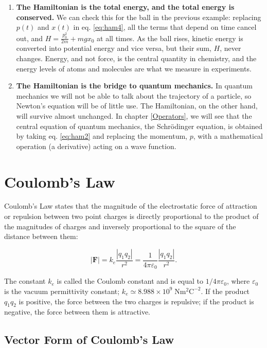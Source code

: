 \documentclass[
  english,
  9pt,
]{extbook}
\theoremstyle{definition}
\theoremstyle{definition}
\theoremstyle{definition}
\theoremstyle{definition}
\theoremstyle{remark}
\begin{document}
\begin{enumerate}
\def\labelenumi{\arabic{enumi}.}
\item
  \textbf{The Hamiltonian is the total energy, and the total energy is conserved.} We can check this for the ball in the previous example: replacing \(p(t)\) and \(x(t)\) in eq. \eqref{eq:ham4}, all the terms that depend on time cancel out, and \(H=\frac{p_0^2}{2m}+mgx_0\) at all times. As the ball rises, kinetic energy is converted into potential energy and vice versa, but their sum, \(H\), never changes. Energy, and not force, is the central quantity in chemistry, and the energy levels of atoms and molecules are what we measure in experiments.
\item
  \textbf{The Hamiltonian is the bridge to quantum mechanics.} In quantum mechanics we will not be able to talk about the trajectory of a particle, so Newton's equation will be of little use. The Hamiltonian, on the other hand, will survive almost unchanged. In chapter \ref{Operators}, we will see that the central equation of quantum mechanics, the Schrödinger equation, is obtained by taking eq. \eqref{eq:ham2} and replacing the momentum, \(p\), with a mathematical operation (a derivative) acting on a wave function.
\end{enumerate}

\section{Coulomb's Law}\label{coulombs-law}

Coulomb's Law states that the magnitude of the electrostatic force of attraction or repulsion between two point charges is directly proportional to the product of the magnitudes of charges and inversely proportional to the square of the distance between them:

\begin{equation}
|\mathbf{F}| = k_e \frac{|q_1q_2|}{r^2} = \frac{1}{4\pi\varepsilon_0}\frac{|q_1q_2|}{r^{2}}.
\label{eq:coulomb1}
\end{equation}

The constant \(k_e\) is called the Coulomb constant and is equal to \({1}/{4\pi\varepsilon_0}\), where \(\varepsilon_0\) is the vacuum permittivity constant; \(k_e \simeq 8.988\times10^9\;\mathrm{Nm^2C^{-2}}\). If the product \(q_1q_2\) is positive, the force between the two charges is repulsive; if the product is negative, the force between them is attractive.

\subsection{Vector Form of Coulomb's Law}\label{vector-form-of-coulombs-law}
\end{document}
